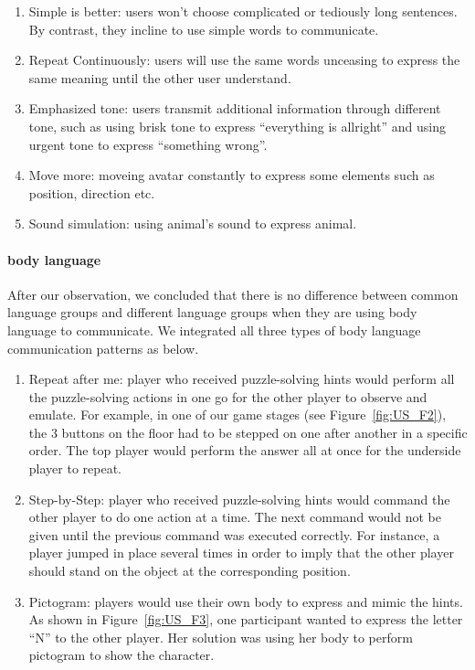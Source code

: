 \begin{enumerate}
  \item Simple is better: users won't choose complicated or tediously long sentences. By contrast, they incline to use simple words to communicate. 

  \item Repeat Continuously: users will use the same words unceasing to express the same meaning until the other user understand.
  
  \item Emphasized tone: users transmit additional information through different tone, such as using brisk tone to express ``everything is allright'' and using urgent tone to express ``something wrong''.
  
  \item Move more: moveing avatar constantly to express some elements such as position, direction etc.
  
  \item Sound simulation: using animal's sound to express animal.
\end{enumerate}

\paragraph{body language}
After our observation, we concluded that there is no difference between common language groups and different language groups when they are using body language to communicate. We integrated all three types of body language communication patterns as below.

\begin{enumerate}
  \item Repeat after me: player who received puzzle-solving hints would perform all the puzzle-solving actions in one go for the other player to observe and emulate. For example, in one of our game stages (see Figure~\ref{fig:US_F2}), the 3 buttons on the floor had to be stepped on one after another in a specific order. The top player would perform the answer all at once for the underside player to repeat. 
 
  \item Step-by-Step: player who received puzzle-solving hints would command the other player to do one action at a time. The next command would not be given until the previous command was executed correctly. For instance, a player jumped in place several times in order to imply that the other player should stand on the object at the corresponding position.
                                  
  \item Pictogram: players would use their own body to express and mimic the hints. As shown in Figure~\ref{fig:US_F3}, one participant wanted to express the letter “N” to the other player. Her solution was using her body to perform pictogram to show the character.
\end{enumerate}

